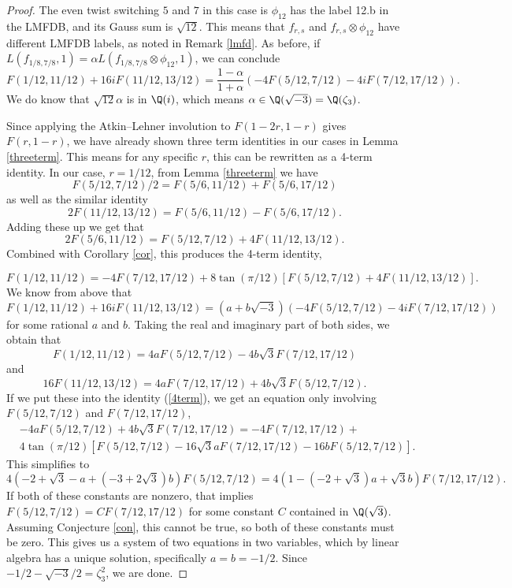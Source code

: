 \documentclass[12pt]{amsart}
\theoremstyle{definition}
\theoremstyle{remark}
\begin{document}
\begin{proof}
     The even twist switching $5$ and $7$ in this case is $\phi_{12}$ has the label 12.b in the LMFDB, and its Gauss sum is $\sqrt{12}$. This means that $f_{r,s}$ and $f_{r,s}\otimes \phi_{12}$ have different LMFDB labels, as noted in Remark \ref{lmfd}. As before, if $L(f_{1/8,7/8},1)=\alpha L(f_{1/8,7/8}\otimes \phi_{12},1)$, we can conclude   $$F(1/12, 11/12) + 16 i F(11/12, 13/12) =  \frac{1-\alpha}{1+\alpha} (-4 F(5/12, 7/12) - 4 i F(7/12, 17/12)).$$ We do know that $\sqrt{12}\alpha$ is in $\Q(i)$, which means $\alpha\in \Q(\sqrt{-3})=\Q(\zeta_3)$.


Since applying the Atkin--Lehner involution to $F(1-2r,1-r)$ gives $F(r,1-r)$, we have already shown three term identities in our cases in Lemma \ref{threeterm}. This means for any specific $r$, this can be rewritten as a 4-term identity. In our case, $r=1/12$, from Lemma \ref{threeterm} we have $$F(5/12,7/12)/2=F(5/6,11/12)+F(5/6,17/12)$$ as well as the similar identity $$2F(11/12,13/12)=F(5/6,11/12)-F(5/6,17/12).$$ Adding these up we get that $$2F(5/6,11/12)=F(5/12,7/12)+4F(11/12,13/12).$$
Combined with Corollary \ref{cor}, this produces the 4-term identity, 

\begin{equation}\label{4term}
    F(1/12,11/12)=-4F(7/12,17/12)+8\tan(\pi/12)[F(5/12,7/12)+4F(11/12,13/12)].
\end{equation}
We know from above that $$F(1/12, 11/12) + 16 i F(11/12, 13/12) =  (a+b\sqrt{-3}) (-4 F(5/12, 7/12) - 4 i F(7/12, 17/12))$$ for some rational $a$ and $b$. Taking the real and imaginary part of both sides, we obtain that $$F(1/12,11/12)=4aF(5/12,7/12)-4b\sqrt{3}F(7/12,17/12)$$ and $$16F(11/12,13/12)=4aF(7/12,17/12)+4b\sqrt{3}F(5/12,7/12).$$ If we put these into the identity (\ref{4term}), we get an equation only involving $F(5/12,7/12)$ and $F(7/12,17/12)$,
\begin{align*}
        &-4aF(5/12,7/12)+4b\sqrt{3}F(7/12,17/12)=-4F(7/12,17/12)+\\&4\tan(\pi/12)[F(5/12,7/12)-16\sqrt{3}aF(7/12,17/12)-16bF(5/12,7/12)].
\end{align*}
This simplifies to $$4 (-2 + \sqrt{3} - a + (-3 + 2 \sqrt{3}) b)F(5/12,7/12)=4 (1 - (-2 + \sqrt{3}) a + \sqrt{3} b)F(7/12,17/12).$$
If both of these constants are nonzero, that implies $F(5/12,7/12)=CF(7/12,17/12)$ for some constant $C$ contained in $\Q(\sqrt{3})$. Assuming Conjecture \ref{con}, this cannot be true, so both of these constants must be zero. This gives us a system of two equations in two variables, which by linear algebra has a unique solution, specifically $a=b=-1/2$. Since $-1/2-\sqrt{-3}/2=\zeta_3^2$, we are done.
\end{proof}
\end{document}
